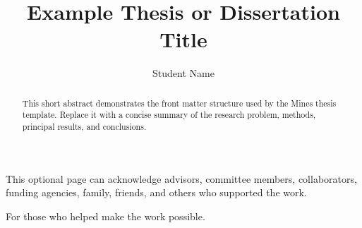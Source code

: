 \documentclass[12pt]{mines-thesis}
\begin{document}
\autotitle
\title{Example Thesis or Dissertation Title}
\author{Student Name}

\begin{abstract}
This short abstract demonstrates the front matter structure used by the Mines
thesis template. Replace it with a concise summary of the research problem,
methods, principal results, and conclusions.
\end{abstract}

\begin{acknowledgment}
This optional page can acknowledge advisors, committee members, collaborators,
funding agencies, family, friends, and others who supported the work.
\end{acknowledgment}

\begin{dedication}
\begin{center}
For those who helped make the work possible.
\end{center}
\end{dedication}

\makefrontmatter







\appendix

\end{document}
